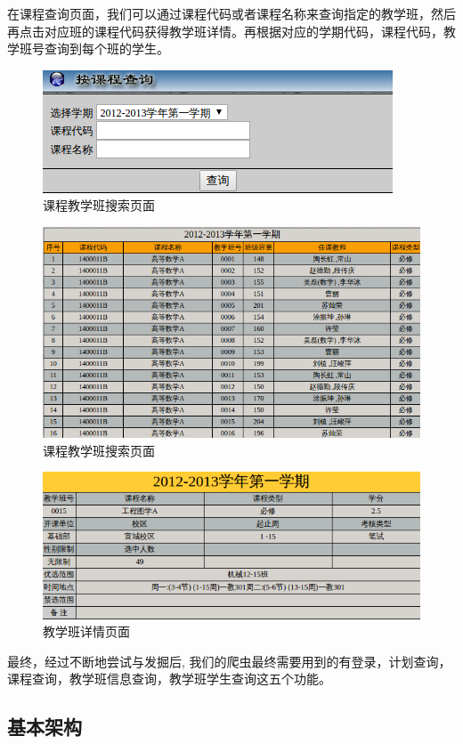\documentclass[UTF8, zihao=-4, heading=false]{ctexart}
\begin{document}
    在课程查询页面，我们可以通过课程代码或者课程名称来查询指定的教学班，然后再点击对应班的课程代码获得教学班详情。再根据对应的学期代码，课程代码，教学班号查询到每个班的学生。
    
    \begin{figure}
        \centering
        \includegraphics[width=0.5\linewidth]{figure/interface-search-course}
        \caption{课程教学班搜索页面}
        \label{fig:interface-search-course}
    \end{figure}
    
    \begin{figure}
        \centering
        \includegraphics[width=0.5\linewidth]{figure/interface-search-result}
        \caption{课程教学班搜索页面}
        \label{fig:interface-search-result}
    \end{figure}
    
    \begin{figure}
        \centering
        \includegraphics[width=0.5\linewidth]{figure/interface-class-info}
        \caption{教学班详情页面}
        \label{fig:interface-class-info}
    \end{figure}

    最终，经过不断地尝试与发掘后, 我们的爬虫最终需要用到的有登录，计划查询，课程查询，教学班信息查询，教学班学生查询这五个功能。
    
    \subsection{基本架构}
    
\end{document}
